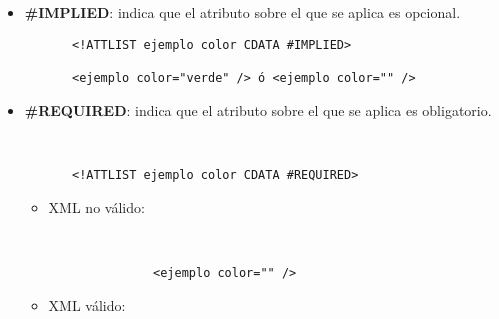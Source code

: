 \begin{itemize}
    \item \textbf{\#IMPLIED}: indica que el atributo sobre el que se aplica es opcional.

    \begin{figure}[H]
        \begin{tcolorbox}[sharp corners, colback=yellow!30, colframe=white!20]
            \scriptsize
            \begin{verbatim}
 <!ATTLIST ejemplo color CDATA #IMPLIED>

 <ejemplo color="verde" /> ó <ejemplo color="" />
            \end{verbatim}
        \end{tcolorbox}
    \end{figure}

    \item \textbf{\#REQUIRED}: indica que el atributo sobre el que se aplica es obligatorio.

      \begin{figure}[H]
        \begin{tcolorbox}[sharp corners, colback=yellow!30, colframe=white!20]
            \scriptsize
            \begin{verbatim}


 <!ATTLIST ejemplo color CDATA #REQUIRED>
            \end{verbatim}
        \end{tcolorbox}
    \end{figure}

    \begin{itemize}
        \item XML no válido:

        \begin{figure}[H]
            \begin{tcolorbox}[sharp corners, colback=yellow!30, colframe=white!20]
                \scriptsize
                \begin{verbatim}


         <ejemplo color="" />
                \end{verbatim}
            \end{tcolorbox}
        \end{figure}

        \item XML válido:

                \begin{figure}[H]
            \begin{tcolorbox}[sharp corners, colback=yellow!30, colframe=white!20]
                \scriptsize
                \begin{verbatim}



\end{verbatim}
\end{tcolorbox}
\end{figure}
\end{itemize}
\end{itemize}
